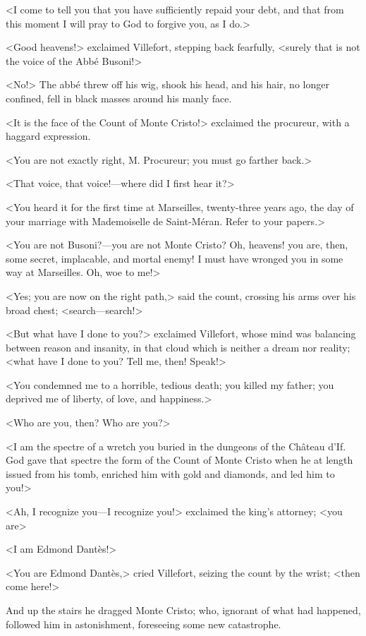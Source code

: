  <I come to tell you that you have sufficiently repaid your debt, and that from this moment I will pray to God to forgive you, as I do.> 

 <Good heavens!> exclaimed Villefort, stepping back fearfully, <surely that is not the voice of the Abbé Busoni!> 

 <No!> The abbé threw off his wig, shook his head, and his hair, no longer confined, fell in black masses around his manly face. 

 <It is the face of the Count of Monte Cristo!> exclaimed the procureur, with a haggard expression. 

 <You are not exactly right, M. Procureur; you must go farther back.> 

 <That voice, that voice!—where did I first hear it?> 

 <You heard it for the first time at Marseilles, twenty-three years ago, the day of your marriage with Mademoiselle de Saint-Méran. Refer to your papers.> 

 <You are not Busoni?—you are not Monte Cristo? Oh, heavens! you are, then, some secret, implacable, and mortal enemy! I must have wronged you in some way at Marseilles. Oh, woe to me!> 

 <Yes; you are now on the right path,> said the count, crossing his arms over his broad chest; <search—search!> 

 <But what have I done to you?> exclaimed Villefort, whose mind was balancing between reason and insanity, in that cloud which is neither a dream nor reality; <what have I done to you? Tell me, then! Speak!> 

 <You condemned me to a horrible, tedious death; you killed my father; you deprived me of liberty, of love, and happiness.> 

 <Who are you, then? Who are you?> 

 <I am the spectre of a wretch you buried in the dungeons of the Château d'If. God gave that spectre the form of the Count of Monte Cristo when he at length issued from his tomb, enriched him with gold and diamonds, and led him to you!> 

 <Ah, I recognize you—I recognize you!> exclaimed the king's attorney; <you are\longdash> 

 <I am Edmond Dantès!> 

 <You are Edmond Dantès,> cried Villefort, seizing the count by the wrist; <then come here!> 

 And up the stairs he dragged Monte Cristo; who, ignorant of what had happened, followed him in astonishment, foreseeing some new catastrophe. 


